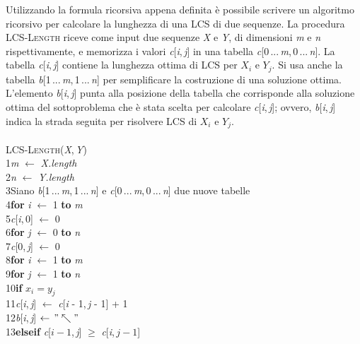 \documentclass[10pt, a4paper]{report}
\newcommand\firsttab[1][0.5cm]{\hspace*{#1}}
\newcommand\secondtab[1][1cm]{\hspace*{#1}}
\newcommand\thirdtab[1][1.5cm]{\hspace*{#1}}
\newcommand\fourthtab[1][2cm]{\hspace*{#1}}
\begin{document}
Utilizzando la formula ricorsiva appena definita è possibile scrivere un algoritmo ricorsivo per calcolare la lunghezza di una LCS di due sequenze. La procedura \textsc{LCS-Length} riceve come input due sequenze \textit{X} e \textit{Y}, di dimensioni \textit{m} e \textit{n} rispettivamente, e memorizza i valori \textit{c}[\textit{i},\,\textit{j}] in una tabella \textit{c}[0\,...\,\textit{m},\,0\,...\,\textit{n}]. La tabella \textit{c}[\textit{i},\,\textit{j}] contiene la lunghezza ottima di LCS per $X_i$ e $Y_j$. Si usa anche la tabella \textit{b}[1\,...\,\textit{m},\,1\,...\,\textit{n}] per semplificare la costruzione di una soluzione ottima. L'elemento \textit{b}[\textit{i},\,\textit{j}] punta alla posizione della tabella che corrisponde alla soluzione ottima del sottoproblema che è stata scelta per calcolare \textit{c}[\textit{i},\,\textit{j}]; ovvero, \textit{b}[\textit{i},\,\textit{j}] indica la strada seguita per risolvere LCS di $X_i$ e $Y_j$.\\\\
\textsc{LCS-Length(\textit{X},\,\textit{Y})}\\
1\firsttab\textit{m} $\leftarrow$ \textit{X.length}\\
2\firsttab\textit{n} $\leftarrow$ \textit{Y.length}\\
3\firsttab Siano \textit{b}[1\,...\,\textit{m},\,1\,...\,\textit{n}] e \textit{c}[0\,...\,\textit{m},\,0\,...\,\textit{n}] due nuove tabelle\\
4\firsttab\textbf{for} \textit{i} $\leftarrow$ 1 \textbf{to} \textit{m}\\
5\secondtab\textit{c}[\textit{i},\,0] $\leftarrow$ 0\\
6\firsttab\textbf{for} \textit{j} $\leftarrow$ 0 \textbf{to} \textit{n}\\
7\secondtab\textit{c}[0,\,\textit{j}] $\leftarrow$ 0\\
8\firsttab\textbf{for} \textit{i} $\leftarrow$ 1 \textbf{to} \textit{m}\\
9\secondtab\textbf{for} \textit{j} $\leftarrow$ 1 \textbf{to} \textit{n}\\
10\thirdtab\textbf{if} $x_i = y_j$\\
11\fourthtab\textit{c}[\textit{i},\,\textit{j}] $\leftarrow$ \textit{c}[\textit{i} - 1,\,\textit{j} - 1] + 1\\
12\fourthtab\textit{b}[\textit{i},\,\textit{j}] $\leftarrow \,"\nwarrow"$\\
13\thirdtab\textbf{elseif} \textit{c}[$i - 1$,\,\textit{j}] $\geq$ \textit{c}[\textit{i},\,$j - 1$]\\
\end{document}
